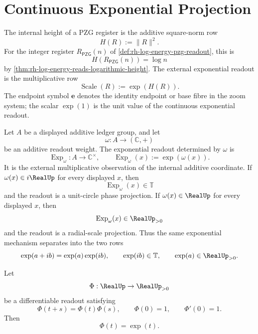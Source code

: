 \section{Continuous Exponential Projection}
\label{sec:rh-prime-fiber-zoom-continuous-exponential-projection}

\begin{definition}
\label{def:rh-internal-height-external-exponential-readout}
The internal height of a PZG register is the additive square-norm row
$$
H(R):=\|R\|^2.
$$
For the integer register $R_{\mathsf{PZG}}(n)$ of
\autoref{def:rh-log-energy-pzg-readout}, this is
$$
H(R_{\mathsf{PZG}}(n))=\log n
$$
by \autoref{thm:rh-log-energy-reads-logarithmic-height}. The external
exponential readout is the multiplicative row
$$
\operatorname{Scale}(R):=\exp(H(R)).
$$
The endpoint symbol $\mathbf e$ denotes the identity endpoint or base
fibre in the zoom system; the scalar $\exp(1)$ is the unit value of the
continuous exponential readout.
\end{definition}

\begin{definition}
\label{def:rh-character-valued-exponential-readout}
Let $A$ be a displayed additive ledger group, and let
$$
\omega:A\to(\mathbb C,+)
$$
be an additive readout weight. The exponential readout determined by
$\omega$ is
$$
\operatorname{Exp}_{\omega}:A\to\mathbb C^\times,
\qquad
\operatorname{Exp}_{\omega}(x):=\exp(\omega(x)).
$$
It is the external multiplicative observation of the internal additive
coordinate. If $\omega(x)\in i\RealUp$ for every displayed $x$, then
$$
\operatorname{Exp}_{\omega}(x)\in\mathbb T
$$
and the readout is a unit-circle phase projection. If
$\omega(x)\in\RealUp$ for every displayed $x$, then
$$
\operatorname{Exp}_{\omega}(x)\in\RealUp_{>0}
$$
and the readout is a radial-scale projection. Thus the same exponential
mechanism separates into the two rows
$$
\exp(a+ib)=\exp(a)\exp(ib),
\qquad
\exp(ib)\in\mathbb T,
\qquad
\exp(a)\in\RealUp_{>0}.
$$
\end{definition}

\begin{theorem}
\label{thm:rh-exponential-readout-normalized-additive-multiplicative}
Let
$$
\Phi:\RealUp\to\RealUp_{>0}
$$
be a differentiable readout satisfying
$$
\Phi(t+s)=\Phi(t)\Phi(s),
\qquad
\Phi(0)=1,
\qquad
\Phi'(0)=1.
$$
Then
$$
\Phi(t)=\exp(t).
$$
\end{theorem}

